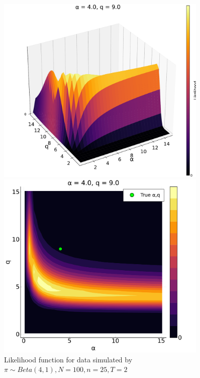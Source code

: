 \documentclass[a4paper, 12pt]{article}
\begin{document}
\begin{figure}
    \centering
    \begin{minipage}{0.55\textwidth}
        \centering
        \includegraphics[width=0.9\textwidth]{../figures/Likelihood_sfplt_4.0.pdf} %
    \end{minipage}\hfill
    \begin{minipage}{0.45\textwidth}
        \centering
        \includegraphics[width=0.9\textwidth]{../figures/Likelihood_contplt_4.0.pdf} %
    \end{minipage}
    \caption{\small Likelihood function for data simulated by $\pi \sim Beta(4, 1), N = 100, n = 25, T = 2$}
\end{figure}
\end{document}
